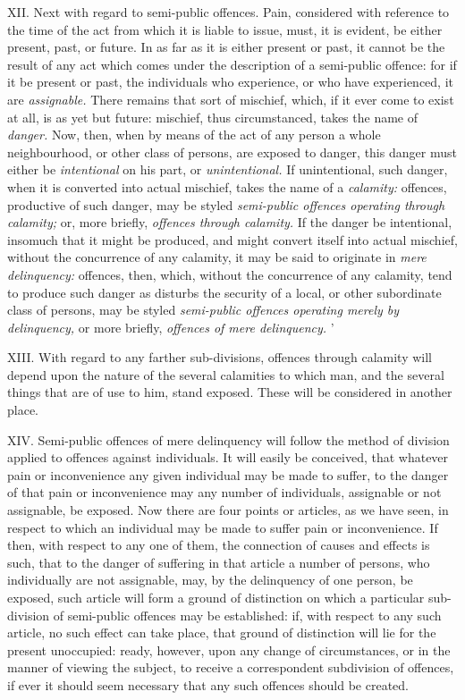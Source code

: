 \documentclass[12pt]{report}
\begin{document}
XII. Next with regard to semi-public offences. Pain, considered with
reference to the time of the act from which it is liable to issue, must,
it is evident, be either present, past, or future. In as far as it is
either present or past, it cannot be the result of any act which comes
under the description of a semi-public offence: for if it be present or
past, the individuals who experience, or who have experienced, it are
\emph{assignable.} There remains that sort of mischief, which, if it
ever come to exist at all, is as yet but future: mischief, thus
circumstanced, takes the name of \emph{danger.} Now, then, when by means
of the act of any person a whole neighbourhood, or other class of
persons, are exposed to danger, this danger must either be
\emph{intentional} on his part, or \emph{unintentional.} If
unintentional, such danger, when it is converted into actual mischief,
takes the name of a \emph{calamity:} offences, productive of such
danger, may be styled \emph{semi-public offences operating through
calamity;} or, more briefly, \emph{offences through calamity.} If the
danger be intentional, insomuch that it might be produced, and might
convert itself into actual mischief, without the concurrence of any
calamity, it may be said to originate in \emph{mere delinquency:}
offences, then, which, without the concurrence of any calamity, tend to
produce such danger as disturbs the security of a local, or other
subordinate class of persons, may be styled \emph{semi-public offences
operating merely by delinquency,} or more briefly, \emph{offences of
mere delinquency.} '

XIII. With regard to any farther sub-divisions, offences through
calamity will depend upon the nature of the several calamities to which
man, and the several things that are of use to him, stand exposed. These
will be considered in another place.

XIV. Semi-public offences of mere delinquency will follow the method of
division applied to offences against individuals. It will easily be
conceived, that whatever pain or inconvenience any given individual may
be made to suffer, to the danger of that pain or inconvenience may any
number of individuals, assignable or not assignable, be exposed. Now
there are four points or articles, as we have seen, in respect to which
an individual may be made to suffer pain or inconvenience. If then, with
respect to any one of them, the connection of causes and effects is
such, that to the danger of suffering in that article a number of
persons, who individually are not assignable, may, by the delinquency of
one person, be exposed, such article will form a ground of distinction
on which a particular sub-division of semi-public offences may be
established: if, with respect to any such article, no such effect can
take place, that ground of distinction will lie for the present
unoccupied: ready, however, upon any change of circumstances, or in the
manner of viewing the subject, to receive a correspondent subdivision of
offences, if ever it should seem necessary that any such offences should
be created.
\end{document}
